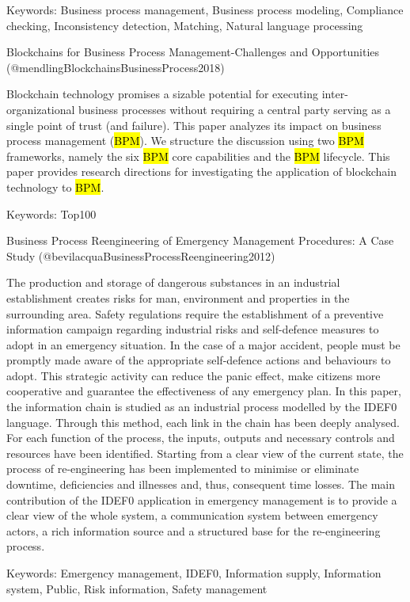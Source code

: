 \documentclass[
  letterpaper,
  DIV=11,
  numbers=noendperiod]{scrartcl}
\begin{document}
Keywords: Business process management, Business process modeling,
Compliance checking, Inconsistency detection, Matching, Natural language
processing

Blockchains for Business Process Management-Challenges and Opportunities
(@mendlingBlockchainsBusinessProcess2018)

Blockchain technology promises a sizable potential for executing
inter-organizational business processes without requiring a central
party serving as a single point of trust (and failure). This paper
analyzes its impact on business process management (\hl{BPM}). We
structure the discussion using two \hl{BPM} frameworks, namely the six
\hl{BPM} core capabilities and the \hl{BPM} lifecycle. This paper
provides research directions for investigating the application of
blockchain technology to \hl{BPM}.

Keywords: Top100

Business Process Reengineering of Emergency Management Procedures: A
Case Study (@bevilacquaBusinessProcessReengineering2012)

The production and storage of dangerous substances in an industrial
establishment creates risks for man, environment and properties in the
surrounding area. Safety regulations require the establishment of a
preventive information campaign regarding industrial risks and
self-defence measures to adopt in an emergency situation. In the case of
a major accident, people must be promptly made aware of the appropriate
self-defence actions and behaviours to adopt. This strategic activity
can reduce the panic effect, make citizens more cooperative and
guarantee the effectiveness of any emergency plan. In this paper, the
information chain is studied as an industrial process modelled by the
IDEF0 language. Through this method, each link in the chain has been
deeply analysed. For each function of the process, the inputs, outputs
and necessary controls and resources have been identified. Starting from
a clear view of the current state, the process of re-engineering has
been implemented to minimise or eliminate downtime, deficiencies and
illnesses and, thus, consequent time losses. The main contribution of
the IDEF0 application in emergency management is to provide a clear view
of the whole system, a communication system between emergency actors, a
rich information source and a structured base for the re-engineering
process.

Keywords: Emergency management, IDEF0, Information supply, Information
system, Public, Risk information, Safety management
\end{document}
